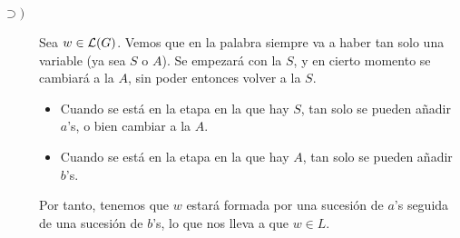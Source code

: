 \begin{ejercicio}
\begin{enumerate}
\begin{description}
            \item[$\supset)$] Sea $w\in\mathcal{L}(G)$. Vemos que en la palabra siempre
            va a haber tan solo una variable (ya sea $S$ o $A$). Se empezará con la $S$, y en cierto momento se cambiará a la $A$,
            sin poder entonces volver a la $S$.
            \begin{itemize}
                \item Cuando se está en la etapa en la que hay $S$, tan solo se pueden añadir $a$'s,
                o bien cambiar a la $A$.
                \item Cuando se está en la etapa en la que hay $A$, tan solo se pueden añadir $b$'s.
            \end{itemize}
            Por tanto, tenemos que $w$ estará formada por una sucesión de
            $a$'s seguida de una sucesión de $b$'s, lo que nos lleva a que $w\in L$.
        \end{description}
    \end{enumerate}
\end{ejercicio}

